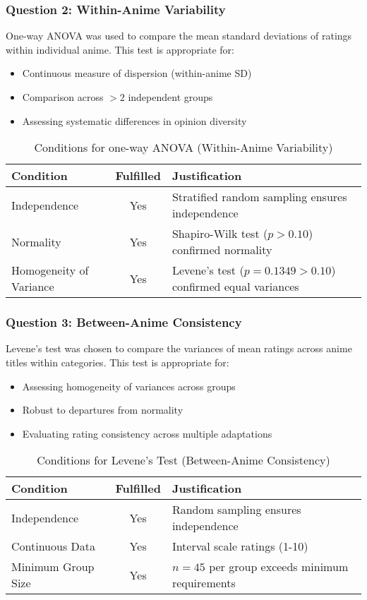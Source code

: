 \documentclass{article}
\begin{document}
\begin{CJK*}{UTF8}{gbsn}
\subsubsection{Question 2: Within-Anime Variability}
One-way ANOVA was used to compare the mean standard deviations of ratings within individual anime. This test is appropriate for:
\begin{itemize}
    \item Continuous measure of dispersion (within-anime SD)
    \item Comparison across $>2$ independent groups
    \item Assessing systematic differences in opinion diversity
\end{itemize}

\begin{table}[H]
\centering
\caption{Conditions for one-way ANOVA (Within-Anime Variability)}
\begin{tabular}{lcp{9cm}}
\toprule
\textbf{Condition} & \textbf{Fulfilled} & \textbf{Justification} \\
\midrule
Independence & Yes & Stratified random sampling ensures independence \\
Normality & Yes & Shapiro-Wilk test ($p > 0.10$) confirmed normality \\
Homogeneity of Variance & Yes & Levene's test ($p = 0.1349 > 0.10$) confirmed equal variances \\
\bottomrule
\end{tabular}
\end{table}

\subsubsection{Question 3: Between-Anime Consistency}
Levene's test was chosen to compare the variances of mean ratings across anime titles within categories. This test is appropriate for:
\begin{itemize}
    \item Assessing homogeneity of variances across groups
    \item Robust to departures from normality
    \item Evaluating rating consistency across multiple adaptations
\end{itemize}

\begin{table}[H]
\centering
\caption{Conditions for Levene's Test (Between-Anime Consistency)}
\begin{tabular}{lcp{7.5cm}}
\toprule
\textbf{Condition} & \textbf{Fulfilled} & \textbf{Justification} \\
\midrule
Independence & Yes & Random sampling ensures independence \\
Continuous Data & Yes & Interval scale ratings (1-10) \\
Minimum Group Size & Yes & $n=45$ per group exceeds minimum requirements \\
\bottomrule
\end{tabular}
\end{table}


\end{CJK*}
\end{document}

